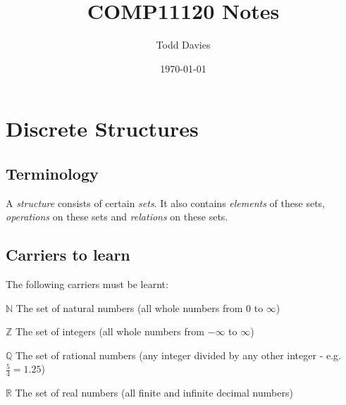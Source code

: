 \documentclass{article}
\author{Todd Davies}
\title{COMP11120 Notes}
\date{\today}
\begin{document}
\lhead{\today}

\maketitle

\section{Discrete Structures}

\subsection{Terminology}

A {\it structure} consists of certain {\it sets}. It also contains {\it elements} of these sets, {\it operations} on these sets and {\it relations} on these sets.

\subsection{Carriers to learn}

The following carriers must be learnt:

$\mathbb{N}$ The set of natural numbers (all whole numbers from $0$ to $\infty$)

$\mathbb{Z}$ The set of integers (all whole numbers from $-\infty$ to $\infty$)

$\mathbb{Q}$ The set of rational numbers (any integer divided by any other integer - e.g. $\frac{5}{4}=1.25$)

$\mathbb{R}$ The set of real numbers (all finite and infinite decimal numbers)
\end{document}
